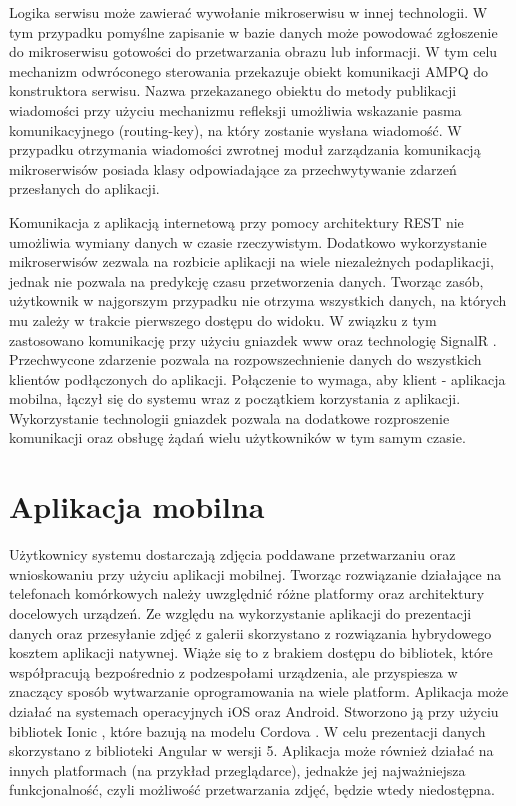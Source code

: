 {Logika serwisu może zawierać wywołanie mikroserwisu w innej technologii. W tym przypadku pomyślne zapisanie w bazie danych może powodować zgłoszenie do mikroserwisu gotowości do przetwarzania obrazu lub informacji. W tym celu mechanizm odwróconego sterowania przekazuje obiekt komunikacji AMPQ do konstruktora serwisu. Nazwa przekazanego obiektu do metody publikacji wiadomości przy użyciu mechanizmu refleksji umożliwia wskazanie pasma komunikacyjnego (routing-key), na który zostanie wysłana wiadomość. W przypadku otrzymania wiadomości zwrotnej moduł zarządzania komunikacją mikroserwisów posiada klasy odpowiadające za przechwytywanie zdarzeń przesłanych do aplikacji. 

Komunikacja z aplikacją internetową przy pomocy architektury REST nie umożliwia wymiany danych w czasie rzeczywistym. Dodatkowo wykorzystanie mikroserwisów zezwala na rozbicie aplikacji na wiele niezależnych podaplikacji, jednak nie pozwala na predykcję czasu przetworzenia danych. Tworząc zasób, użytkownik w najgorszym przypadku nie otrzyma wszystkich danych, na których mu zależy w trakcie pierwszego dostępu do widoku. W związku z tym zastosowano komunikację przy użyciu gniazdek www oraz technologię SignalR \cite{SignalR}. Przechwycone zdarzenie pozwala na rozpowszechnienie danych do wszystkich klientów podłączonych do aplikacji. Połączenie to wymaga, aby klient - aplikacja mobilna, łączył się do systemu wraz z początkiem korzystania z aplikacji. Wykorzystanie technologii gniazdek pozwala na dodatkowe rozproszenie komunikacji oraz obsługę żądań wielu użytkowników w tym samym czasie.

\section{Aplikacja mobilna}
{ Użytkownicy systemu dostarczają zdjęcia poddawane przetwarzaniu oraz wnioskowaniu przy użyciu aplikacji mobilnej. Tworząc rozwiązanie działające na telefonach komórkowych należy uwzględnić różne platformy oraz architektury docelowych urządzeń. Ze względu na wykorzystanie aplikacji do prezentacji danych oraz przesyłanie zdjęć z galerii skorzystano z rozwiązania hybrydowego kosztem aplikacji natywnej. Wiąże się to z brakiem dostępu do bibliotek, które współpracują bezpośrednio z podzespołami urządzenia, ale przyspiesza w znaczący sposób wytwarzanie oprogramowania na wiele platform. Aplikacja może działać na systemach operacyjnych iOS oraz Android. Stworzono ją przy użyciu bibliotek Ionic \cite{Ionic}, które bazują na modelu Cordova \cite{Cordova}. W celu prezentacji danych skorzystano z biblioteki Angular\cite{Angular} w wersji 5. Aplikacja może również działać na innych platformach (na przykład przeglądarce), jednakże jej najważniejsza funkcjonalność, czyli możliwość przetwarzania zdjęć, będzie wtedy niedostępna.
	
}}
